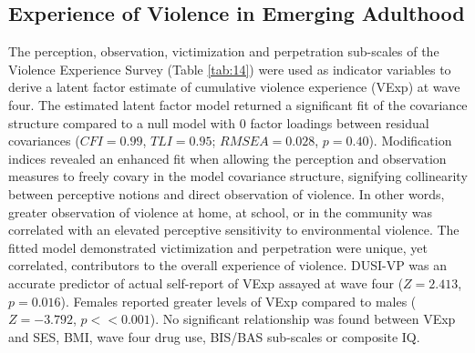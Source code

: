 \documentclass[utf8]{article}
\begin{document}
\subsection*{Experience of Violence in Emerging Adulthood} The perception, observation, victimization and perpetration sub-scales of the Violence Experience Survey (Table \ref{tab:14}) were used as indicator variables to derive a latent factor estimate of cumulative violence experience (VExp) at wave four. The estimated latent factor model returned a significant fit of the covariance structure compared to a null model with $0$ factor loadings between residual covariances ($CFI = 0.99$, $TLI = 0.95$; $RMSEA = 0.028$, $p = 0.40$). Modification indices revealed an enhanced fit when allowing the perception and observation measures to freely covary in the model covariance structure, signifying collinearity between perceptive notions and direct observation of violence. In other words, greater observation of violence at home, at school, or in the community was correlated with an elevated perceptive sensitivity to environmental violence. The fitted model demonstrated victimization and perpetration were unique, yet correlated, contributors to the overall experience of violence. DUSI-VP was an accurate predictor of actual self-report of VExp assayed at wave four ($Z=2.413$, $p=0.016$). Females reported greater levels of VExp compared to males ($Z=-3.792$, $p<<0.001$). No significant relationship was found between VExp and SES, BMI, wave four drug use, BIS/BAS sub-scales or composite IQ.  
\end{document}

